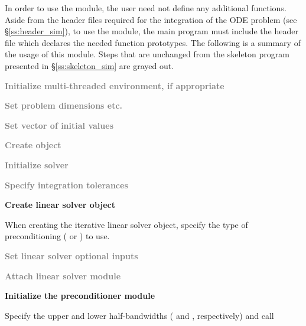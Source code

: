In order to use the {\cvbandpre} module, the user need not define any
additional functions.
Aside from the header files required for the integration of the ODE problem
(see \S\ref{ss:header_sim}),  to use the {\cvbandpre} module, the main program
must include the header file  which declares the needed
function prototypes.
The following is a summary of the usage of this module. Steps that are
unchanged from the skeleton program presented in
\S\ref{ss:skeleton_sim} are grayed out.
\begin{Steps}

\item
  \textcolor{gray}{\bf Initialize multi-threaded environment, if appropriate}

\item
  \textcolor{gray}{\bf Set problem dimensions etc.}

\item
  \textcolor{gray}{\bf Set vector of initial values}

\item
  \textcolor{gray}{\bf Create {\cvodes} object}

\item
  \textcolor{gray}{\bf Initialize {\cvodes} solver}

\item
  \textcolor{gray}{\bf Specify integration tolerances}

\item
  {\bf Create linear solver object}

  When creating the iterative linear solver object, specify the type
  of preconditioning ( or ) to use.

\item
  \textcolor{gray}{\bf Set linear solver optional inputs}

\item \label{i:bandpre_attach}
  \textcolor{gray}{\bf Attach linear solver module}

\item \label{i:bandpre_init}
  {\bf Initialize the {\cvbandpre} preconditioner module}

  Specify the upper and lower half-bandwidths ( and , respectively) and call



\end{Steps}
